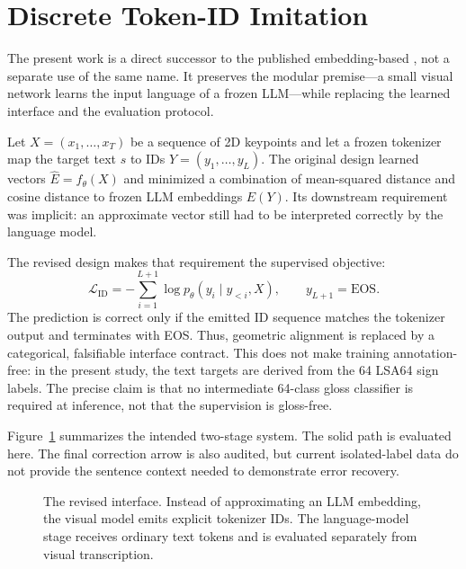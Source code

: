 \section{Discrete Token-ID Imitation}

The present work is a direct successor to the published embedding-based \system{}
\citep{velasquez2026imitator}, not a separate use of the same name.  It preserves
the modular premise---a small visual network learns the input language of a frozen
LLM---while replacing the learned interface and the evaluation protocol.

Let $X=(x_1,\ldots,x_T)$ be a sequence of 2D keypoints and let a frozen tokenizer
map the target text $s$ to IDs $Y=(y_1,\ldots,y_L)$.  The original design learned
vectors $\hat{E}=f_\theta(X)$ and minimized a combination of mean-squared distance
and cosine distance to frozen LLM embeddings $E(Y)$.  Its downstream requirement
was implicit: an approximate vector still had to be interpreted correctly by the
language model.

The revised design makes that requirement the supervised objective:
\begin{equation}
    \mathcal{L}_{\mathrm{ID}}
      = -\sum_{i=1}^{L+1}\log p_\theta(y_i\mid y_{<i},X),
    \qquad y_{L+1}=\mathrm{EOS}.
\end{equation}
The prediction is correct only if the emitted ID sequence matches the tokenizer
output and terminates with EOS.  Thus, geometric alignment is replaced by a
categorical, falsifiable interface contract.  This does not make training
annotation-free: in the present study, the text targets are derived from the 64
LSA64 sign labels.  The precise claim is that no intermediate 64-class gloss
classifier is required at inference, not that the supervision is gloss-free.

Figure~\ref{fig:pipeline} summarizes the intended two-stage system.  The solid
path is evaluated here.  The final correction arrow is also audited, but current
isolated-label data do not provide the sentence context needed to demonstrate
error recovery.

\begin{figure}[t]
\centering\small
{}
\caption{The revised \system{} interface.  Instead of approximating an LLM
embedding, the visual model emits explicit tokenizer IDs.  The language-model
stage receives ordinary text tokens and is evaluated separately from visual
transcription.}
\label{fig:pipeline}
\end{figure}
